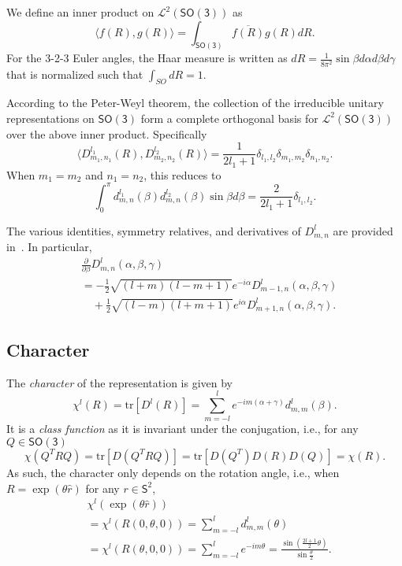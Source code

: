 \documentclass[onecolumn,11pt]{IEEEtran}
\newcommand{\pair}[1]{\ensuremath{\langle #1 \rangle}}
\newcommand{\trs}[1]{\mathrm{tr}\ensuremath{[#1]}}
\newcommand{\deriv}[2]{\ensuremath{\frac{\partial #1}{\partial #2}}}
\newcommand{\SO}{\ensuremath{\mathsf{SO(3)}}}
\newcommand{\Sph}{\ensuremath{\mathsf{S}}}
\begin{document}
We define an inner product on $\mathcal{L}^2(\SO)$ as
\[
    \pair{f(R),g(R)}=\int_{\SO} \overline{f(R)} g(R) dR.
\]
For the 3-2-3 Euler angles, the Haar measure is written as $dR = \frac{1}{8\pi^2}\sin\beta d\alpha d\beta d\gamma$ that is normalized such that $\int_{SO} dR = 1$. 

According to the Peter-Weyl theorem, the collection of the irreducible unitary representations on $\SO$ form a complete orthogonal basis for $\mathcal{L}^2(\SO)$ over the above inner product. 
Specifically
\begin{equation}
\pair{ D^{l_1}_{m_1,n_1}(R), D^{l_2}_{m_2,n_2}(R)} = \frac{1}{2l_1+1}\delta_{l_1,l_2}\delta_{m_1,m_2}\delta_{n_1,n_2}. \label{eqn:D_ortho}
\end{equation}
When $m_1=m_2$ and $n_1=n_2$, this reduces to
\[
\int_{0}^\pi d^{l_1}_{m,n}(\beta)d^{l_2}_{m,n}(\beta)\sin\beta d\beta = \frac{2}{2l_1+1}\delta_{l_1,l_2}. 
\]

The various identities, symmetry relatives, and derivatives of $D^{l}_{m,n}$ are provided in~\cite{VarMos88}. 
In particular,
\begin{align}
&\deriv{}{\beta} D^l_{m,n}(\alpha,\beta,\gamma)\nonumber\\
& = -\frac{1}{2}\sqrt{(l+m)(l-m+1)}e^{-i\alpha} D^l_{m-1,n}(\alpha,\beta,\gamma)\nonumber\\
& \quad + \frac{1}{2}\sqrt{(l-m)(l+m+1)}e^{i\alpha} D^l_{m+1,n}(\alpha,\beta,\gamma).\label{eqn:dD_dbeta}
\end{align}


\subsection{Character}

The \textit{character} of the representation is given by
\[
\chi^l(R) = \trs{D^l(R)}=\sum_{m=-l}^l e^{-im(\alpha+\gamma)} d^l_{m,m}(\beta).
\]
It is a \textit{class function} as it is invariant under the conjugation, i.e., for any $Q\in\SO$
\[
\chi(Q^T R Q) = \trs{D(Q^T R Q)}=\trs{D(Q^T)D(R)D(Q)}=\chi(R).
\]
As such, the character only depends on the rotation angle, i.e., when $R=\exp(\theta\hat r)$ for any $r\in\Sph^2$, 
\begin{align*}
&\chi^l(\exp(\theta\hat r))\\
&= \chi^l{(R(0,\theta,0))}= \sum_{m=-l}^l d^l_{m,m}(\theta)\\
&= \chi^l{(R(\theta,0,0))}= \sum_{m=-l}^l e^{-im\theta}
=\frac{\sin(\frac{2l+1}{2}\theta)}{\sin\frac{\theta}{2}}.
\end{align*}
\end{document}
